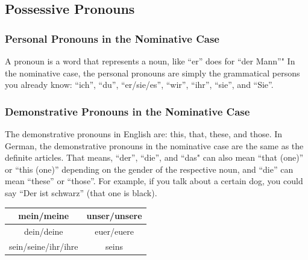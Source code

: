 \subsection{Possessive Pronouns}

\subsubsection{Personal Pronouns in the Nominative Case}

A pronoun is a word that represents a noun, like ``er'' does for ``der Mann''" In the nominative case, the personal pronouns are simply the grammatical persons you already know: ``ich'', ``du'', ``er/sie/es'', ``wir'', ``ihr'', ``sie'', and ``Sie''.

\subsubsection{Demonstrative Pronouns in the Nominative Case}

The demonstrative pronouns in English are: this, that, these, and those. In German, the demonstrative pronouns in the nominative case are the same as the definite articles. That means, ``der'', ``die'', and ``das" can also mean ``that (one)'' or ``this (one)'' depending on the gender of the respective noun, and ``die'' can mean ``these'' or ``those''. For example, if you talk about a certain dog, you could say ``Der ist schwarz'' (that one is black).

\begin{center}\begin{tabular}{c|c}
  mein/meine & unser/unsere \\
	\hline
	dein/deine & euer/euere \\
	\hline
	sein/seine/ihr/ihre & seins \\
\end{tabular}\end{center}

\vspace{0.5in}

